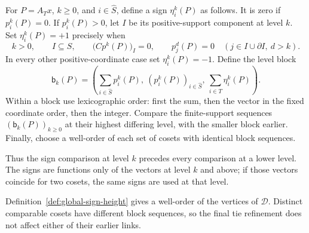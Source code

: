\begin{definition}\label{def:global-sign-height}
For $P=A_Tx$, $k\ge0$, and $i\in\widehat S$, define a sign
$\eta_i^k(P)$ as follows.  It is zero if $p_i^k(P)=0$.  If $p_i^k(P)>0$,
let $I$ be its positive-support component at level $k$.  Set
$\eta_i^k(P)=+1$ precisely when
\begin{equation}\label{eq:global-null-sign}
 k>0,\qquad I\subseteq S,\qquad
 \bigl(Cp^k(P)\bigr)_I=0,\qquad
 p_j^d(P)=0
 \quad(j\in I\cup\partial I,\ d>k).
\end{equation}
In every other positive-coordinate case set $\eta_i^k(P)=-1$.
Define the level block
\begin{equation}\label{eq:global-height-block}
 \mathsf b_k(P)=
 \left(
    \sum_{i\in\widehat S}p_i^k(P),\
    (p_i^k(P))_{i\in\widehat S},\
    \sum_{i\in T}\eta_i^k(P)
 \right).
\end{equation}
Within a block use lexicographic order: first the sum, then the vector in
the fixed coordinate order, then the integer.  Compare the finite-support
sequences $(\mathsf b_k(P))_{k\ge0}$ at their highest differing level,
with the smaller block earlier.  Finally, choose a well-order of each set
of cosets with identical block sequences.
\end{definition}

Thus the sign comparison at level $k$ precedes every comparison at a
lower level.  The signs are functions only of the vectors at level $k$
and above; if those vectors coincide for two cosets, the same signs are
used at that level.

\begin{lemma}\label{lem:global-well-order}
Definition~\ref{def:global-sign-height} gives a well-order of the vertices
of $\mathcal D$.  Distinct comparable cosets have different block
sequences, so the final tie refinement does not affect either of their
earlier links.
\end{lemma}

